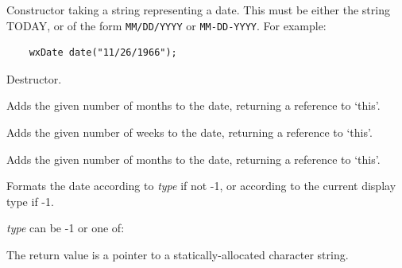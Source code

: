 
Constructor taking a string representing a date. This must be either the string TODAY, or of the
form {\tt MM/DD/YYYY} or {\tt MM-DD-YYYY}. For example:

\begin{verbatim}
    wxDate date("11/26/1966");
\end{verbatim}



Destructor.




Adds the given number of months to the date, returning a reference to `this'.



Adds the given number of weeks to the date, returning a reference to `this'.



Adds the given number of months to the date, returning a reference to `this'.


 

Formats the date according to {\it type} if not -1, or according
to the current display type if -1.

{\it type} can be -1 or one of:

\begin{twocollist}\itemsep=0pt
\end{twocollist}

The return value is a pointer to a statically-allocated character string.


 

